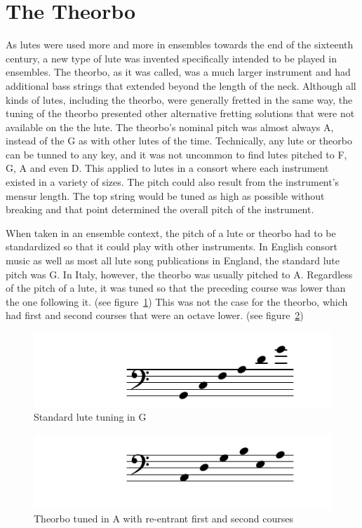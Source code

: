 \section{The Theorbo}

As lutes were used more and more in ensembles towards the end of the sixteenth century, a
new type of lute was invented specifically intended to be played in ensembles.  The theorbo, as
it was called, was a much larger instrument and had additional bass strings that extended
beyond the length of the neck.  Although all kinds of lutes, including the theorbo, were
generally fretted in the same way, the tuning of the theorbo presented other alternative
fretting solutions that were not available on the the lute.  The theorbo's nominal pitch
was almost always A, instead of the G as with other lutes of the time.  Technically, any
lute or theorbo can be tunned to any key, and it was not uncommon to find lutes pitched to
F, G, A and even D.  This applied to lutes in a consort where each instrument existed in a variety of
sizes.  The pitch could also result from the instrument's mensur length.  The top string
would be tuned as high as possible without breaking and that point determined
the overall pitch of the instrument.

When taken in an ensemble context, the pitch of a lute or theorbo had to be
standardized so that it could play with other instruments.  In English consort music as
well as most all lute song publications in England, the standard lute pitch was G.
In Italy, however, the theorbo was usually pitched to A.  Regardless of the pitch of a
lute, it was tuned so that the preceding course was lower than the one
following it. (see figure~\ref{g-lute})  This was not the case for the theorbo, which
had first and second courses that were an octave lower. (see figure~\ref{a-theorbo})

\begin{figure}[h]
\centering
\includegraphics{examples/lute-tuning.pdf}
\caption{Standard lute tuning in G}
\label{g-lute}
\end{figure}
\begin{figure}[h]
\centering
\includegraphics{examples/theorbo-tuning.pdf}
\caption{Theorbo tuned in A with re-entrant first and second courses}
\label{a-theorbo}
\end{figure}

